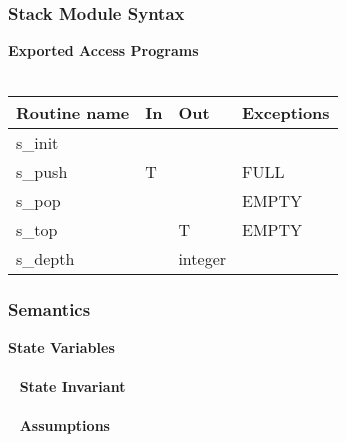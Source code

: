 \documentclass[t,12pt,numbers,fleqn,handout]{beamer}
\begin{document}

\begin{frame}
\frametitle{Stack Module Syntax}

\textbf{Exported Access Programs}\\
~\newline
\begin{tabular}{| l | l | l | l |}
\hline
\textbf{Routine name} & \textbf{In} & \textbf{Out} & \textbf{Exceptions}\\
\hline
s\_init & ~ & ~ & ~\\
\hline
s\_push & T & ~ & FULL\\
\hline
s\_pop & ~ & ~ & EMPTY\\
\hline
s\_top & ~ & T & EMPTY\\
\hline
s\_depth & ~ & integer & ~\\
\hline
\end{tabular}

\end{frame}


\begin{frame}
\frametitle{Semantics}

\textbf{State Variables}\\
~\newline
{}\\
~\newline
\textbf{State Invariant}\\
~\newline
{}\\
~\newline
\textbf{Assumptions}\\
~\newline
{}\\

\end{frame}

\end{document}
